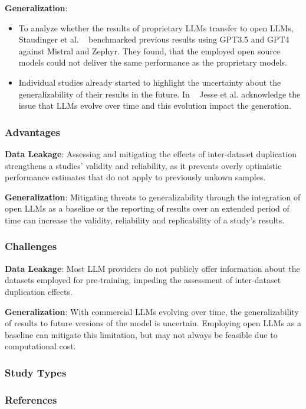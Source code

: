 \textbf{Generalization}:
\begin{itemize}
  \item To analyze whether the results of proprietary LLMs transfer to open LLMs, Staudinger et al. ~\cite{10.1145/3673791.3698432} benchmarked previous results using GPT3.5 and GPT4 against Mistral and Zephyr. They found, that the employed open source models could not deliver the same performance as the proprietary models.
  \item Individual studies already started to highlight the uncertainty about the generalizability of their results in the future. In ~\cite{10174227} Jesse et al. acknowledge the issue that LLMs evolve over time and this evolution impact the generation.
\end{itemize}



\subsubsection{Advantages}
\textbf{Data Leakage}:
Assessing and mitigating the effects of inter-dataset duplication strengthens a studies' validity and reliability, as it prevents overly optimistic performance estimates that do not apply to previously unkown samples.

\textbf{Generalization}:
Mitigating threats to generalizability through the integration of open LLMs as a baseline or the reporting of results over an extended period of time can increase the validity, reliability and replicability of a study's results.



\subsubsection{Challenges}
\textbf{Data Leakage}:
Most LLM providers do not publicly offer information about the datasets employed for pre-training, impeding the assessment of inter-dataset duplication effects.

\textbf{Generalization}:
With commercial LLMs evolving over time, the generalizability of results to future versions of the model is uncertain. Employing open LLMs as a baseline can mitigate this limitation, but may not always be feasible due to computational cost.




\subsubsection{Study Types}


\subsubsection{References}





